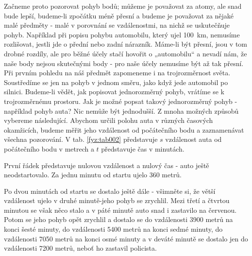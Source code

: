 {    Začneme proto pozorovat pohyb bodů; můžeme je považovat za atomy, ale snad bude lepší, 
    budeme-li zpočátku méně přesní a budeme je považovat za nějaké malé předměty - malé v porovnání 
    se vzdálenostmi, na nichž se uskutečňuje pohyb. Například při popisu pohybu automobilu, který 
    ujel \SI{100}{\km}, nemusíme rozlišovat, jestli jde o přední nebo zadní nárazník. Máme-li být 
    přesní, jsou v tom drobné rozdíly, ale pro běžné účely stačí hovořit o „automobilu“ a nevadí 
    nám, že naše body nejsou skutečnými body - pro naše účely nemusíme být až tak přesní. Při 
    prvním pohledu na náš předmět zapomeneme i na trojrozměrnost světa. Soustředíme se jen na pohyb 
    v jednom směru, jako když jede automobil po silnici. Budeme-li vědět, jak popisovat 
    jednorozměrný pohyb, vrátíme se k trojrozměrnému prostoru. Jak je možné popsat takový 
    jednorozměrný pohyb - například pohyb auta? Nic nemůže být jednodušší. Z mnoha možných způsobů 
    vybereme následující. Abychom určili polohu auta v různých časových okamžicích, budeme měřit 
    jeho vzdálenost od počátečního bodu a zaznamenávat všechna pozorování. V tab. \ref{fyz:tab002} 
    představuje \(s\) vzdálenost auta od počátečního bodu v metrech a \(t\) představuje čas v 
    minutách.

    První řádek představuje nulovou vzdálenost a nulový čas - auto ještě neodstartovalo. Za jednu 
    minutu od startu ujelo \num{360} metrů.

    Po dvou minutách od startu se dostalo ještě dále - všimněte si, že větší vzdálenost ujelo v 
    druhé minutě-jeho pohyb se zrychlil. Mezi třetí a čtvrtou minutou se však něco stalo a v páté 
    minutě auto snad i zastavilo na červenou. Potom se jeho pohyb opět zrychlil a dostalo se do 
    vzdálenosti \num{3900} metrů na konci šesté minuty, do vzdálenosti \num{5400} metrů na konci 
    sedmé minuty, do vzdálenosti \num{7050} metrů na konci osmé minuty a v deváté minutě se dostalo 
    jen do vzdálenosti \num{7200} metrů, neboť ho zastavil policista.

}
